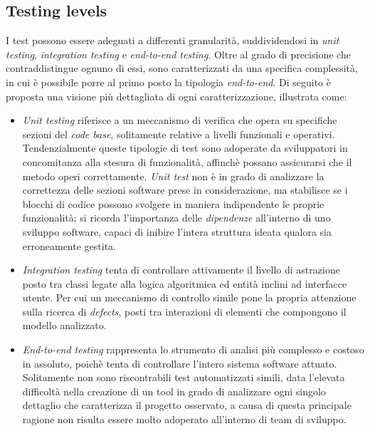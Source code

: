 \documentclass{article}
\begin{document}
\subsection*{Testing levels}
\large
I test possono essere adeguati a differenti granularità, suddividendosi in \textit{unit testing}, \textit{integration testing} e \textit{end-to-end testing}. Oltre al grado di precisione che contraddistingue ognuno di essi, sono caratterizzati da una specifica complessità, in cui è possibile porre al primo posto la tipologia \textit{end-to-end}. Di seguito è proposta una visione più dettagliata di ogni caratterizzazione, illustrata come:
\begin{itemize}[label={-}]
    \itemsep0em
    \item \textit{Unit testing} riferisce a un meccanismo di verifica che opera su specifiche sezioni del \textit{code base}, solitamente relative a livelli funzionali e operativi. Tendenzialmente queste tipologie di test sono adoperate da sviluppatori in concomitanza alla stesura di funzionalità, affinchè possano assicurarsi che il metodo operi correttamente. \textit{Unit test} non è in grado di analizzare la correttezza delle sezioni software prese in considerazione, ma stabilisce se i blocchi di codice possono svolgere in maniera indipendente le proprie funzionalità; si ricorda l'importanza delle \textit{dipendenze} all'interno di uno sviluppo software, capaci di inibire l'intera struttura ideata qualora sia erroneamente gestita.
    \item \textit{Integration testing} tenta di controllare attivamente il livello di astrazione posto tra classi legate alla logica algoritmica ed entità inclini ad interfacce utente. Per cui un meccanismo di controllo simile pone la propria attenzione sulla ricerca di \textit{defects}, posti tra interazioni di elementi che compongono il modello analizzato.     
    \item \textit{End-to-end testing} rappresenta lo strumento di analisi più complesso e costoso in assoluto, poichè tenta di controllare l'intero sistema software attuato. Solitamente non sono riscontrabili test automatizzati simili, data l'elevata difficoltà nella creazione di un tool in grado di analizzare ogni singolo dettaglio che caratterizza il progetto osservato, a causa di questa principale ragione non risulta essere molto adoperato all'interno di team di sviluppo.
\end{itemize}
\end{document}
